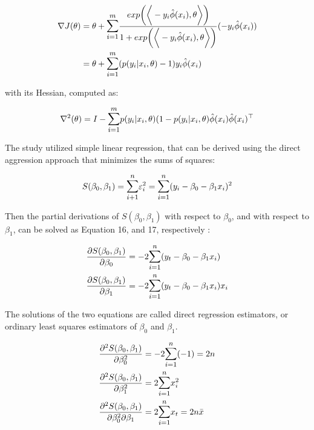 \documentclass[12pt]{article}
\begin{document}
\begin{align}
	\nabla J(\theta) &= \theta + \mathlarger{\sum^{m}_{i=1}} \frac{exp \bigg( \bigg \langle  -y_i \hat{\phi} (x_i), \theta \bigg \rangle \bigg)}{1 + exp \bigg(\bigg \langle  -y_i \hat{\phi} (x_i), \theta \bigg \rangle \bigg )} (-y_i \hat{\phi} (x_i)) \nonumber \\
	&= \theta + \mathlarger{\sum^{m}_{i=1}} (p(y_i|x_i, \theta) - 1)y_i \hat{\phi}(x_i) \nonumber
\end{align}

with its Hessian, computed as:

\begin{equation}
	\nabla ^2 (\theta) = I - \mathlarger{\sum^{m}_{i=1}}p (y_i|x_i, \theta) (1 - p (y_i|x_i, \theta) \hat{\phi} (x_i) \hat{\phi} (x_i)^\top
\end{equation}

The study utilized simple linear reqression, that can be derived using the direct aggression approach that minimizes the sums of squares:

\begin{align*}
	S(\beta_0, \beta_1) = \mathlarger{\sum^{n}_{i+1}} \varepsilon^2_i = \mathlarger{\sum^{n}_{i=1}} (y_i - \beta_0 -\beta_1 x_i)^2 \nonumber 
\end{align*}

Then the partial derivations of $S(\beta_0, \beta_1)$ with respect to $\beta_0$, and with respect to $\beta_1$, can be solved as Equation 16, and 17, respectively : 

\begin{align}
	&\frac{\partial S(\beta_0, \beta_1)}{\partial \beta_0} = -2 \mathlarger{\sum^{n}_{i=1}} (y_t - \beta_0 - \beta_1 x_i) \\ 
	&\frac{\partial S(\beta_0, \beta_1)}{\partial \beta_1} = -2 \mathlarger{\sum^{n}_{i=1}} (y_t - \beta_0 - \beta_1 x_i) x_i 
\end{align}

The solutions of the two equations are called direct regression estimators, or ordinary least squares estimators of $\beta_0$ and $\beta_1$. 

\begin{align*}
	\frac{\partial ^2 S(\beta_0, \beta_1)}{\partial \beta_0^2} &= -2 \mathlarger{\sum^{n}_{i=1}} (-1) = 2n \\
	\frac{\partial ^2 S(\beta_0, \beta_1)}{\partial \beta_1^2} &= 2 \mathlarger{\sum^{n}_{i=1}} x^2_i \\ 
	\frac{\partial ^2 S(\beta_0, \beta_1)}{\partial \beta_0^2 \partial \beta_1} &= 2 \mathlarger{\sum^{n}_{i=1}} x_t = 2n\bar{x} 
\end{align*}
\end{document}
